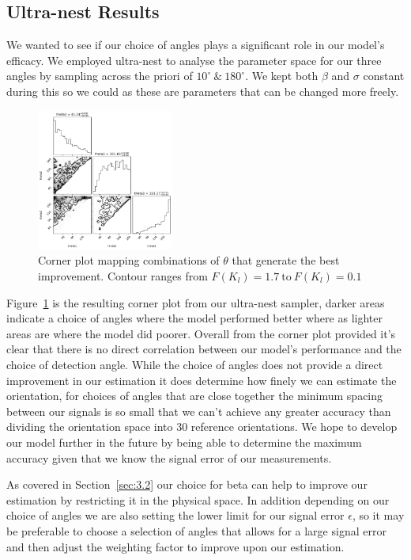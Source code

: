 \documentclass[final, 3p]{elsarticle}
\begin{document}
\subsection{Ultra-nest Results}
\label{sec:3.3}
We wanted to see if our choice of angles plays a significant role in our model's efficacy. We employed ultra-nest to analyse the parameter space for our three angles by sampling across the priori of $10^{\circ} \ \& \ 180^{\circ}$. We kept both $\beta$ and $\sigma$ constant during this so we could as these are parameters that can be changed more freely. 

\begin{figure}[h]
	\centering
	\includegraphics[width=0.4\textwidth]{./Images/corneranglesfreed-1.png}
	\caption{Corner plot mapping combinations of $\theta$ that generate the best improvement. Contour ranges from $F(K_l) = 1.7 \ \text{to} \ F(K_l)  =  0.1$ }
	\label{fig:corner}
\end{figure}

Figure~\ref{fig:corner} is the resulting corner plot from our ultra-nest sampler, darker areas indicate a choice of angles where the model performed better where as lighter areas are where the model did poorer. Overall from the corner plot provided it's clear that there is no direct correlation between our model's performance and the choice of detection angle. While the choice of angles does not provide a direct improvement in our estimation it does determine how finely we can estimate the orientation, for choices of angles that are close together the minimum spacing between our signals is so small that we can't achieve any greater accuracy than dividing the orientation space into 30 reference orientations. We hope to develop our model further in the future by being able to determine the maximum accuracy given that we know the signal error of our measurements.  

As covered in Section~\ref{sec:3.2} our choice for beta can help to improve our estimation by restricting it in the physical space. In addition depending on our choice of angles we are also setting the lower limit for our signal error $\epsilon$, so it may be preferable to choose a selection of angles that allows for a large signal error and then adjust the weighting factor to improve upon our estimation. 
\end{document}
